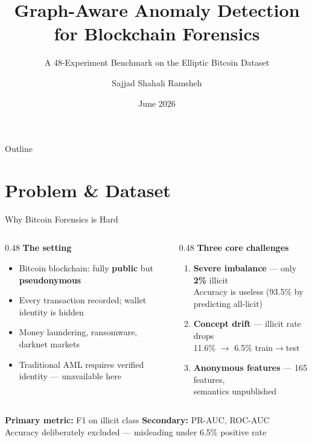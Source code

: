 \documentclass[aspectratio=169,11pt]{beamer}
\title[Elliptic Anomaly Detection]{Graph-Aware Anomaly Detection\\
       for Blockchain Forensics}
\subtitle{A 48-Experiment Benchmark on the Elliptic Bitcoin Dataset}
\author{Sajjad Shahali Ramsheh}
\institute{Department of Control \& Computer Engineering (DAUIN)\\
           Politecnico di Torino}
\date{June 2026}
\newcommand{\hi}[1]{\textcolor{accent}{\textbf{#1}}}
\begin{document}
\begin{frame}
  \titlepage
\end{frame}

\begin{frame}{Outline}
  \tableofcontents[hidesubsections]
\end{frame}

\section{Problem \& Dataset}

\begin{frame}{Why Bitcoin Forensics is Hard}
  \begin{columns}[T]
    \begin{column}{0.48\textwidth}
      \textbf{The setting}\\[4pt]
      \begin{itemize}
        \item Bitcoin blockchain: fully \textbf{public} but \textbf{pseudonymous}
        \item Every transaction recorded; wallet identity is hidden
        \item Money laundering, ransomware, darknet markets
        \item Traditional AML requires verified identity --- unavailable here
      \end{itemize}
    \end{column}
    \begin{column}{0.48\textwidth}
      \textbf{Three core challenges}\\[4pt]
      \begin{enumerate}
        \item \hi{Severe imbalance} --- only \hi{2\%} illicit\\
              Accuracy is useless (93.5\% by predicting all-licit)
        \item \hi{Concept drift} --- illicit rate drops\\
              11.6\% $\to$ 6.5\% train$\to$test
        \item \hi{Anonymous features} --- 165 features,\\
              semantics unpublished
      \end{enumerate}
    \end{column}
  \end{columns}
  \vfill
  \centering
  \colorbox{primary!10}{\parbox{0.9\textwidth}{\centering
    \textbf{Primary metric:} F1 on illicit class \quad
    \textbf{Secondary:} PR-AUC, ROC-AUC\\
    \small Accuracy deliberately excluded --- misleading under 6.5\% positive rate
  }}
\end{frame}
\end{document}

